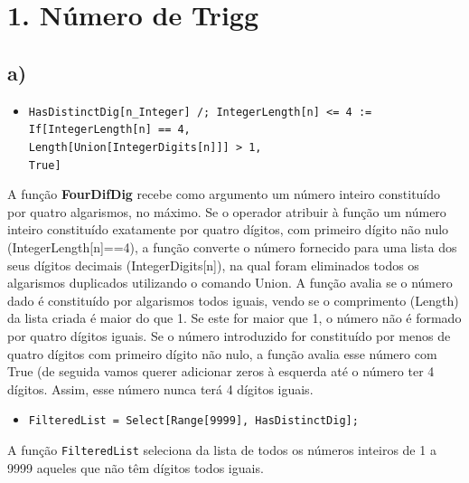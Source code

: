 \documentclass[12pt,a4paper]{article}
\begin{document}
    \setcounter{page}{2}
    \setcounter{secnumdepth}{0} %
    \setlength{\parskip}{0em}

    \newlength{\imagewidth} %
    \setlength{\imagewidth}{8cm} %


    \section{1. Número de Trigg}
    \subsection{a)}
        \begin{itemize}
            \item \texttt{HasDistinctDig[n\_Integer] /; IntegerLength[n] <= 4 := \\ If[IntegerLength[n] == 4, \\ Length[Union[IntegerDigits[n]]] > 1, \\ True]}
        \end{itemize}
        
        A função \textbf{FourDifDig} recebe como argumento um número inteiro constituído por quatro algarismos, no máximo. Se o operador atribuir à função um número inteiro constituído exatamente por quatro dígitos, com primeiro dígito não nulo (IntegerLength[n]==4), a função converte o número fornecido para uma lista dos seus dígitos decimais (IntegerDigits[n]), na qual foram eliminados todos os algarismos duplicados utilizando o comando Union. A função avalia se o número dado é constituído por algarismos todos iguais, vendo se o comprimento (Length) da lista criada é maior do que 1. Se este for maior que 1, o número não é formado por quatro dígitos iguais. Se o número introduzido for constituído por menos de quatro dígitos com primeiro dígito não nulo, a função avalia esse número com True (de seguida vamos querer adicionar zeros à esquerda até o número ter 4 dígitos. Assim, esse número nunca terá 4 dígitos iguais.

        \begin{itemize}
            \item \texttt{FilteredList = Select[Range[9999], HasDistinctDig];}
        \end{itemize}
        
        A função \texttt{FilteredList} seleciona da lista de todos os números inteiros de 1 a 9999 aqueles que não têm dígitos todos iguais.
\end{document}

